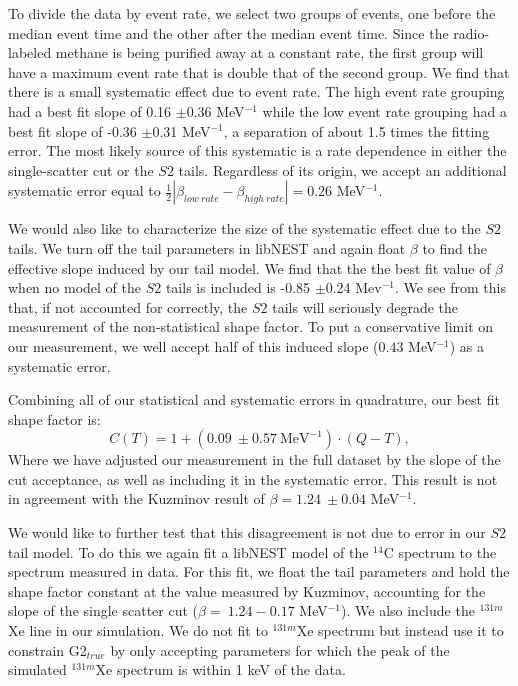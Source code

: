 To divide the data by event rate, we select two groups of events, one before the median event time and the other after the median event time. Since the radio-labeled methane is being purified away at a constant rate, the first group will have a maximum event rate that is double that of the second group. We find that there is a small systematic effect due to event rate. The high event rate grouping had a best fit slope of 0.16 $\pm$0.36 MeV$^{-1}$ while the low event rate grouping had a best fit slope of -0.36 $\pm$0.31 MeV$^{-1}$, a separation of about 1.5 times the fitting error. The most likely source of this systematic is a rate dependence in either the single-scatter cut or the $S2$ tails. Regardless of its origin, we accept an additional systematic error equal to $\frac{1}{2}|\beta_{low \ rate}-\beta_{high \ rate}|=0.26$ MeV$^{-1}$. 

We would also like to characterize the size of the systematic effect due to the $S2$ tails. We turn off the tail parameters in libNEST and again float $\beta$ to find the effective slope induced by our tail model. We find that the the best fit value of $\beta$ when no model of the $S2$ tails is included is -0.85 $\pm$0.24 Mev$^{-1}$. We see from this that, if not accounted for correctly, the $S2$ tails will seriously degrade the measurement of the non-statistical shape factor. To put a conservative limit on our measurement, we well accept half of this induced slope (0.43 MeV$^{-1}$) as a systematic error.

Combining all of our statistical and systematic errors in quadrature, our best fit shape factor is:
\begin{equation}
C(T)=1+(0.09 \ \pm0.57 \ \text{MeV}^{-1})\cdot(Q-T),
\end{equation}
Where we have adjusted our measurement in the full dataset by the slope of the cut acceptance, as well as including it in the systematic error. This result is not in agreement with the Kuzminov result of $\beta=1.24 \ \pm0.04$ MeV$^{-1}$. 

We would like to further test that this disagreement is not due to error in our $S2$ tail model. To do this we again fit a libNEST model of the $^{14}$C spectrum to the spectrum measured in data. For this fit, we float the tail parameters and hold the shape factor constant at the value measured by Kuzminov, accounting for the slope of the single scatter cut ($\beta = \ 1.24-0.17$ MeV$^{-1}$). We also include the $^{131m}$Xe line in our simulation. We do not fit to $^{131m}$Xe spectrum but instead use it to constrain G2$_{true}$ by only accepting parameters for which the peak of the simulated $^{131m}$Xe spectrum is within 1 keV of the data. 

